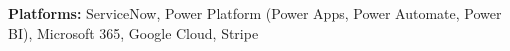 \textbf{Platforms:} ServiceNow, Power Platform (Power Apps, Power Automate, Power BI), Microsoft 365, Google Cloud, Stripe \\
